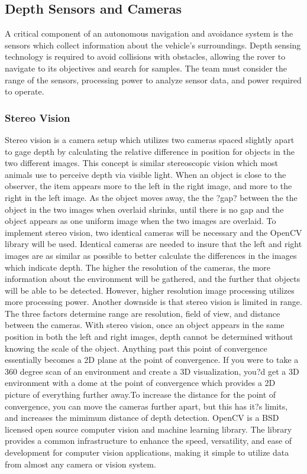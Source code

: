 \documentclass[10pt, oneside,onecolumn]{IEEEtran}
\begin{document}
\subsection{Depth Sensors and Cameras}

	A critical component of an autonomous navigation and avoidance system is the sensors which collect information about the vehicle's surroundings. Depth sensing technology is required to avoid collisions with obstacles, allowing the rover to navigate to its objectives and search for samples. The team must consider the range of the sensors, processing power to analyze sensor data, and power required to operate.

\subsubsection{Stereo Vision}

Stereo vision is a camera setup which utilizes two cameras spaced slightly apart to gage depth by calculating the relative difference in position for objects in the two different images. This concept is similar stereoscopic vision which most animals use to perceive depth via visible light. When an object is close to the observer, the item appears more to the left in the right image, and more to the right in the left image. As the object moves away, the the ?gap? between the the object in the two images when overlaid shrinks, until there is no gap and the object appears as one uniform image when the two images are overlaid. 
To implement stereo vision, two identical cameras will be necessary and the OpenCV library will be used. Identical cameras are needed to insure that the left and right images are as similar as possible to better calculate the differences in the images which indicate depth. The higher the resolution of the cameras, the more information about the environment will be gathered, and the further that objects will be able to be detected. However, higher resolution image processing utilizes more processing power. 
Another downside is that stereo vision is limited in range. The three factors determine range are resolution, field of view, and distance between the cameras. With stereo vision, once an object appears in the same position in both the left and right images, depth cannot be determined without knowing the scale of the object. Anything past this point of convergence essentially becomes a 2D plane at the point of convergence. If you were to take a 360 degree scan of an environment and create a 3D visualization, you?d get a 3D environment with a dome at the point of convergence which provides a 2D picture of everything further away.To increase the distance for the point of convergence, you can move the cameras further apart, but this has it?s limits, and increases the mimimum distance of depth detection. 
OpenCV is a BSD licensed open source computer vision and machine learning library. The library provides a common infrastructure to enhance the speed, versatility, and ease of development for computer vision applications, making it simple to utilize data from almost any camera or vision system. 
\end{document}
